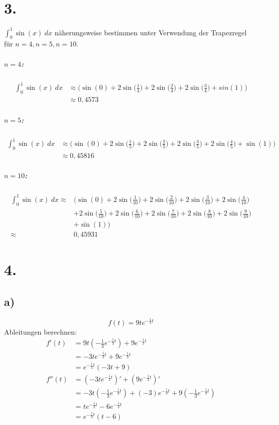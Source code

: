 \documentclass[a4paper]{scrartcl}
\begin{document}
\newpage
\section{3.}
\(\int_0^1 \sin(x)\ dx\) näherungsweise bestimmen unter Verwendung der Trapezregel 
\\für \(n=4, n=5, n=10\).
\subparagraph{\(n=4\):}
\begin{align}
\int_0^1 \sin(x)\ dx &\approx\Big(\sin(0)+2\sin\Big(\frac{1}{4}\Big)+2\sin\Big(\frac{2}{4}\Big)+2\sin\Big(\frac{3}{4}\Big)+sin(1)\Big)\\
	&\approx0,4573
\end{align}
\subparagraph{\(n=5\):}
\begin{align}
\int_0^1 \sin(x)\ dx &\approx\Big(\sin(0)+2\sin\Big(\frac{1}{5}\Big)+2\sin\Big(\frac{2}{5}\Big)+2\sin\Big(\frac{3}{5}\Big)+2\sin\Big(\frac{4}{5}\Big)+\sin(1)\Big)\\
	&\approx0,45816
\end{align}
\subparagraph{\(n=10\):}
\begin{align}
\int_0^1 \sin(x)\ dx \approx &\Big(\sin(0)+2\sin\Big(\frac{1}{10}\Big)
+2\sin\Big(\frac{2}{10}\Big)+2\sin\Big(\frac{3}{10}\Big)+2\sin\Big(\frac{4}{10}\Big)\\
	&+2\sin\Big(\frac{5}{10}\Big)+2\sin\Big(\frac{6}{10}\Big)+
	2\sin\Big(\frac{7}{10}\Big)+2\sin\Big(\frac{8}{10}\Big)+2\sin\Big(\frac{9}{10}\Big)\\
	&+\sin(1)\Big)\\
	\approx &0,45931
\end{align}

\newpage
\section{4.}
\subsection{a)}
\[f(t)=9te^{-\frac 1 3 t}\]
Ableitungen berechnen:
\begin{align}
f'(t) &= 9t(-\frac 1 3 e^{-\frac 1 3 t}) + 9e^{-\frac 1 3 t} \\
      &= -3te^{-\frac 1 3 t} + 9e^{-\frac 1 3 t} \\
      &= e^{-\frac 1 3 t} (-3t+9) \\
f''(t) &= (-3te^{-\frac 1 3 t})' + (9e^{-\frac 1 3 t})' \\
       &= -3t (-\frac 1 3 e^{-\frac 1 3 t}) + (-3)e^{-\frac 1 3 t} + 9(-\frac 1 3 e^{-\frac 1 3 t}) \\
       &= te^{-\frac 1 3 t} - 6e^{-\frac 1 3 t} \\
       &= e^{-\frac 1 3 t} (t-6)
\end{align}
\end{document}
